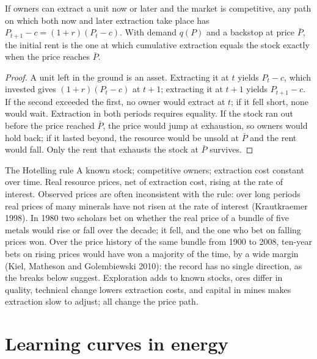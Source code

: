 \begin{proposition}\label{prop:b3:environmental-and-resource-economics:hotelling}
If owners can extract a unit now or later and the market is competitive, any path
on which both now and later extraction take place has $P_{t+1} - c = (1 + r)(P_t - c)$. With demand $q(P)$ and a backstop at price $\bar P$, the
initial rent is the one at which cumulative extraction equals the stock exactly when
the price reaches $\bar P$.
\end{proposition}

\begin{proof}
A unit left in the ground is an asset. Extracting it at $t$ yields $P_t - c$, which invested
gives $(1 + r)(P_t - c)$ at $t + 1$; extracting it at $t + 1$ yields $P_{t+1} - c$. If the second exceeded the first,
no owner would extract at $t$; if it fell short, none would wait. Extraction in both
periods requires equality. If the stock ran out before the price reached $\bar P$, the
price would jump at exhaustion, so owners would hold back; if it lasted beyond, the
resource would be unsold at $\bar P$ and the rent would fall. Only the rent that exhausts the
stock at $\bar P$ survives.
\end{proof}

\begin{model}{The Hotelling rule}
\assumes A known stock; competitive owners; extraction cost constant over time.
\predicts Real resource prices, net of extraction cost, rising at the rate of
interest.
\tested Observed prices are often inconsistent with the rule: over long periods
real prices of many minerals have not risen at the rate of interest (Krautkraemer
1998). %
In 1980 two scholars bet on whether the real price of a bundle of five metals would
rise or fall over the decade; it fell, and the one who bet on falling prices won.
Over the price history of the same bundle from 1900 to 2008, ten-year bets on rising
prices would have won a majority of the time, by a wide margin
(Kiel, Matheson and Golembiewski 2010): the record has no single direction, as the
breaks below suggest. %
\breaks Exploration adds to known stocks, ores differ in quality, technical change
lowers extraction costs, and capital in mines makes extraction slow to adjust; all
change the price path. %
\end{model}

\section{Learning curves in energy}\label{sec:b3:environmental-and-resource-economics:learning}


